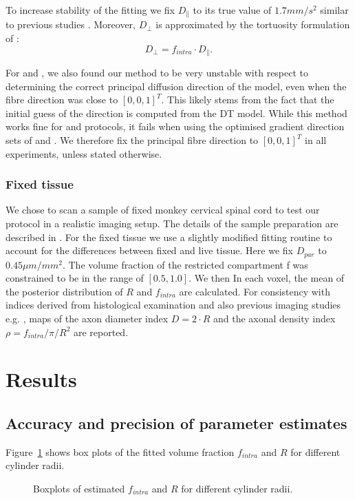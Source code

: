 To increase stability of the fitting we fix $D_\parallel$ to its true value of $1.7mm/s^2$ similar to previous studies \citep{Assaf:2008,Barazany:2009,Alexander:2010}. Moreover, $D_\bot$ is approximated by the tortuosity formulation of \citep{Szafer:1995}:
$$
    D_{\bot} = f_{intra}\cdot D_{\parallel}.
$$


For {\DO} and {\FD}, we also found our method to be very unstable with respect to determining the correct principal diffusion direction of the model, even when the fibre direction was close to $[0,0,1]^T$. This likely stems from the fact that the initial guess of the direction is computed from the \gls{DT} model. While this method works fine for \OI and \SD protocols, it fails when using the optimised gradient direction sets of \DO and \FD. We therefore fix the principal fibre direction to $[0,0,1]^T$ in all experiments, unless stated otherwise.

\subsubsection*{Fixed tissue}
We chose to scan a sample of fixed monkey cervical spinal cord to test our protocol in a realistic imaging setup. The details of the sample preparation are described in \citep{Lundell:2011}. For the fixed tissue we use a slightly modified fitting routine to account for the differences between fixed and live tissue. Here we fix $D_{par}$ to $0.45\mu m/mm^2$. The volume fraction of the restricted compartment f was constrained to be in the range of $[0.5, 1.0]$. We then In each voxel, the mean of the posterior distribution of $R$ and $f_{intra}$ are calculated. For consistency with indices derived from histological examination and also previous imaging studies e.g. \citep{Alexander:2010}, maps of the axon diameter index $D=2\cdot R$ and the axonal density index $\rho=f_{intra}/\pi/R^2$ are reported.

\FloatBarrier

\section{Results}
\subsection{Accuracy and precision of parameter estimates}
Figure~\ref{fig:chapter7 exp1 boxplots 60mT} shows box plots of the fitted volume fraction $f_{intra}$ and $R$ for different cylinder radii.
\begin{figure}[H]
	\centering
	
	
	\caption{Boxplots of estimated $f_{intra}$ and $R$ for different cylinder radii.}
	\label{fig:chapter7 exp1 boxplots 60mT}
\end{figure}

